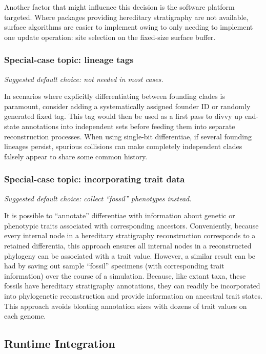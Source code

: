 Another factor that might influence this decision is the software platform targeted.
Where packages providing hereditary stratigraphy are not available, surface algorithms are easier to implement owing to only needing to implement one update operation: site selection on the fixed-size surface buffer.

\subsubsection{Special-case topic: lineage tags}
\textit{Suggested default choice: not needed in most cases.}

In scenarios where explicitly differentiating between founding clades is paramount, consider adding a systematically assigned founder ID or randomly generated fixed tag.
This tag would then be used as a first pass to divvy up end-state annotations into independent sets before feeding them into separate reconstruction processes.
When using single-bit differentiae, if several founding lineages persist, spurious collisions can make completely independent clades falsely appear to share some common history.

\subsubsection{Special-case topic: incorporating trait data}
\textit{Suggested default choice: collect ``fossil'' phenotypes instead.}

It is possible to ``annotate'' differentiae with information about genetic or phenotypic traits associated with corresponding ancestors.
Conveniently, because every internal node in a hereditary stratigraphy reconstruction corresponds to a retained differentia, this approach ensures all internal nodes in a reconstructed phylogeny can be associated with a trait value.
However, a similar result can be had by saving out sample ``fossil'' specimens (with corresponding trait information) over the course of a simulation.
Because, like extant taxa, these fossils have hereditary stratigraphy annotations, they can readily be incorporated into phylogenetic reconstruction and provide information on ancestral trait states.
This approach avoids bloating annotation sizes with dozens of trait values on each genome.

\subsection{Runtime Integration}

